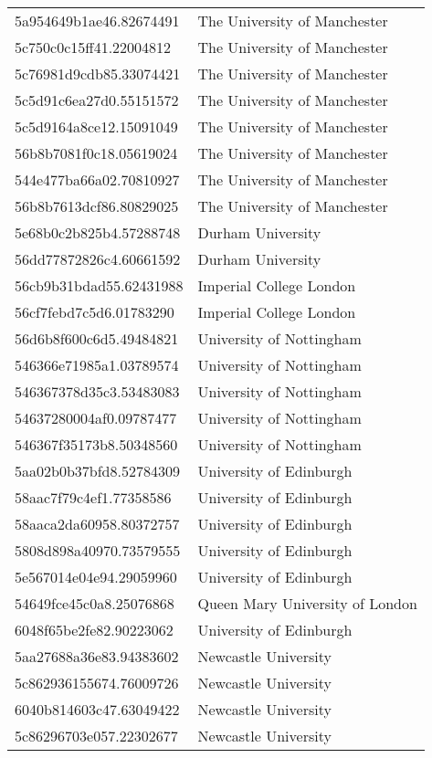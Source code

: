 \begin{tabular}{ll}
5a954649b1ae46.82674491 & The University of Manchester \\
5c750c0c15ff41.22004812 & The University of Manchester \\
5c76981d9cdb85.33074421 & The University of Manchester \\
5c5d91c6ea27d0.55151572 & The University of Manchester \\
5c5d9164a8ce12.15091049 & The University of Manchester \\
56b8b7081f0c18.05619024 & The University of Manchester \\
544e477ba66a02.70810927 & The University of Manchester \\
56b8b7613dcf86.80829025 & The University of Manchester \\
5e68b0c2b825b4.57288748 & Durham University \\
56dd77872826c4.60661592 & Durham University \\
56cb9b31bdad55.62431988 & Imperial College London \\
56cf7febd7c5d6.01783290 & Imperial College London \\
56d6b8f600c6d5.49484821 & University of Nottingham \\
546366e71985a1.03789574 & University of Nottingham \\
546367378d35c3.53483083 & University of Nottingham \\
54637280004af0.09787477 & University of Nottingham \\
546367f35173b8.50348560 & University of Nottingham \\
5aa02b0b37bfd8.52784309 & University of Edinburgh \\
58aac7f79c4ef1.77358586 & University of Edinburgh \\
58aaca2da60958.80372757 & University of Edinburgh \\
5808d898a40970.73579555 & University of Edinburgh \\
5e567014e04e94.29059960 & University of Edinburgh \\
54649fce45c0a8.25076868 & Queen Mary University of London \\
6048f65be2fe82.90223062 & University of Edinburgh \\
5aa27688a36e83.94383602 & Newcastle University \\
5c862936155674.76009726 & Newcastle University \\
6040b814603c47.63049422 & Newcastle University \\
5c86296703e057.22302677 & Newcastle University \\

\end{tabular}
